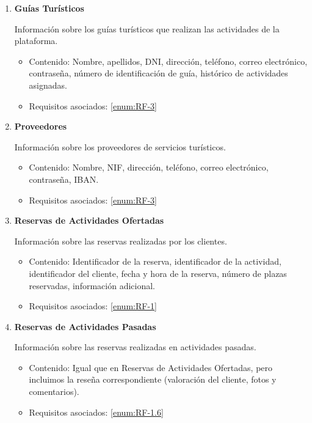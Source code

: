 \begin{enumerate}[label={\color{red}RI-\arabic{enumi}.}]
    \item \textbf{Guías Turísticos}
    
    Información sobre los guías turísticos que realizan las actividades de la plataforma.
    \begin{itemize}
        \item {\color{violet}Contenido:} Nombre, apellidos, DNI, dirección, teléfono, correo electrónico, contraseña, número de identificación de guía, histórico de actividades asignadas.
        \item {\color{violet}Requisitos asociados:} \ref{enum:RF-3}
    \end{itemize}

    \item \textbf{Proveedores}
    
    Información sobre los proveedores de servicios turísticos.
    \begin{itemize}
        \item {\color{violet}Contenido:} Nombre, NIF, dirección, teléfono, correo electrónico, contraseña, IBAN.
        \item {\color{violet}Requisitos asociados:} \ref{enum:RF-3}
    \end{itemize}

    \item \textbf{Reservas de Actividades Ofertadas}
    
    Información sobre las reservas realizadas por los clientes.
    \begin{itemize}
        \item {\color{violet}Contenido:} Identificador de la reserva, identificador de la actividad, identificador del cliente, fecha y hora de la reserva, número de plazas reservadas, información adicional.
        \item {\color{violet}Requisitos asociados:} \ref{enum:RF-1}
    \end{itemize}

    \item \textbf{Reservas de Actividades Pasadas}
    
    Información sobre las reservas realizadas en actividades pasadas.
    \begin{itemize}
        \item {\color{violet}Contenido:} Igual que en Reservas de Actividades Ofertadas, pero incluimos la reseña correspondiente (valoración del cliente, fotos y comentarios).
        \item {\color{violet}Requisitos asociados:} \ref{enum:RF-1.6}
    \end{itemize}
\end{enumerate}
